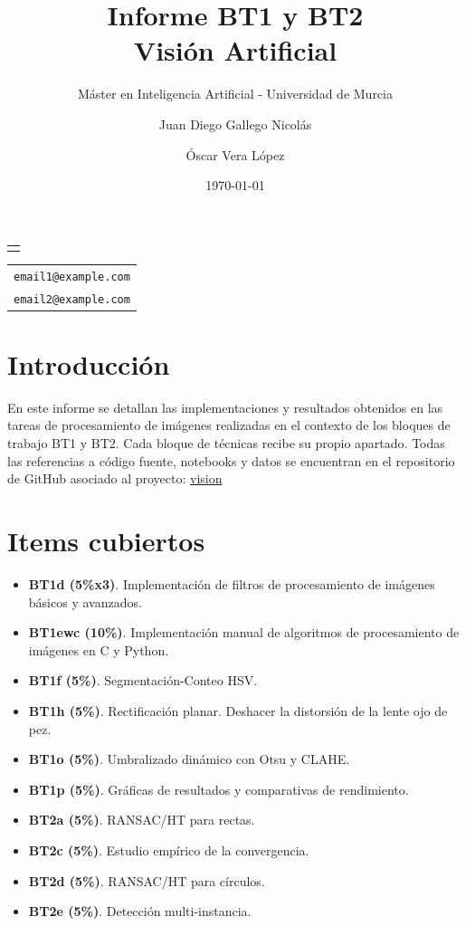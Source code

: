\documentclass[11pt,a4paper]{article}
\subtitle{Máster en Inteligencia Artificial - Universidad de Murcia}
\makeatletter
\providecommand\@subtitle{}
\providecommand\@emailone{email1@example.com}
\providecommand\@emailtwo{email2@example.com}
\renewcommand{\maketitle}{%
    \begin{titlepage}
        \centering
        \thispagestyle{empty}
        \vspace*{2.5cm}
        {\Huge\bfseries\@title\par}
        \vspace{1cm}
        {\Large\itshape\@subtitle\par}
        \vspace{3cm}
        {\large
            \begin{tabular}{c}
                \@author
            \end{tabular}\par
        }
        \vspace{0.6cm}
        {\small
            \begin{tabular}{c}
                \texttt{\@emailone} \\[0.8ex]
                \texttt{\@emailtwo}
            \end{tabular}\par
        }
        \vfill
        {\large \@date\par}
    \end{titlepage}%
}
\makeatother
\begin{document}
\title{Informe BT1 y BT2\\[1ex]\large Visión Artificial}
\author{Juan Diego Gallego Nicolás \and Óscar Vera López}
\date{\today}

\maketitle

\renewcommand{\contentsname}{Índice}
\setcounter{tocdepth}{3}
\tableofcontents
\clearpage

\section*{Introducción}
En este informe se detallan las implementaciones y resultados obtenidos en las tareas de procesamiento de imágenes realizadas en el contexto de los bloques de trabajo BT1 y BT2.
Cada bloque de técnicas recibe su propio apartado. 
Todas las referencias a código fuente, notebooks y datos se encuentran en el repositorio de GitHub asociado al proyecto: \href{https://github.com/oscarveral/vision}{vision}

\section*{Items cubiertos}
\begin{itemize}
  \item \textbf{BT1d (5\%x3)}. Implementación de filtros de
    procesamiento de imágenes básicos y avanzados.
  \item \textbf{BT1ewc (10\%)}. Implementación manual de algoritmos
    de procesamiento de imágenes en C y Python.
  \item \textbf{BT1f (5\%)}. Segmentación-Conteo HSV.
  \item \textbf{BT1h (5\%)}. Rectificación planar. Deshacer la
    distorsión de la lente ojo de pez.
  \item \textbf{BT1o (5\%)}. Umbralizado dinámico con Otsu y CLAHE.
  \item \textbf{BT1p (5\%)}. Gráficas de resultados y comparativas
    de rendimiento.
  \item \textbf{BT2a (5\%)}. RANSAC/HT para rectas.
  \item \textbf{BT2c (5\%)}. Estudio empírico de la convergencia.
  \item \textbf{BT2d (5\%)}. RANSAC/HT para círculos.
  \item \textbf{BT2e (5\%)}. Detección multi-instancia.
\end{itemize}
\end{document}
